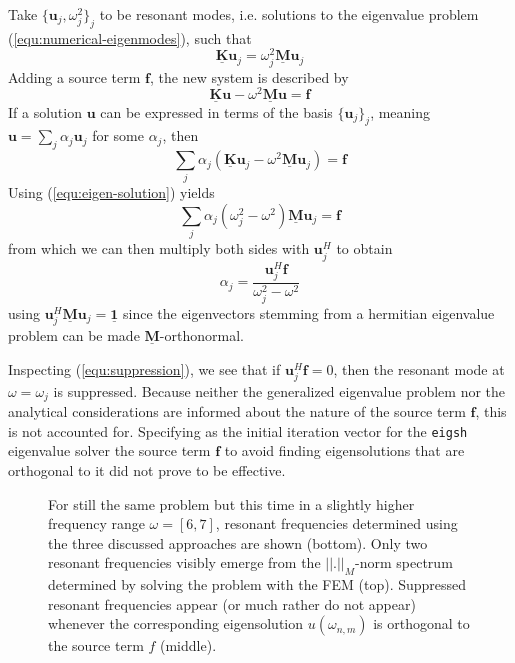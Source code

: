 \documentclass[11pt, a4paper]{article}
\begin{document}
Take $\{ \mathbf{u}_j, \omega_j^2 \}_j$ to be resonant modes, i.e. solutions to 
the eigenvalue problem (\ref{equ:numerical-eigenmodes}), such that
\begin{equation}
    \mathbf{\underline{K}} \mathbf{u}_j = \omega_j^2 \mathbf{\underline{M}} \mathbf{u}_j
    \label{equ:eigen-solution}
\end{equation}
Adding a source term $\mathbf{f}$, the new system is described by
\begin{equation}
    \mathbf{\underline{K}} \mathbf{u} - \omega^2 \mathbf{\underline{M}} \mathbf{u} = \mathbf{f}
\end{equation}
If a solution $\mathbf{u}$ can be expressed in terms of the basis $\{ \mathbf{u}_j \}_j$,
meaning $\mathbf{u} = \sum_j \alpha_j \mathbf{u}_j$ for some $\alpha_j$, then
\begin{equation} 
    \sum_j \alpha_j (\mathbf{\underline{K}} \mathbf{u}_j - \omega^2 \mathbf{\underline{M}} \mathbf{u}_j) = \mathbf{f}
\end{equation}
Using (\ref{equ:eigen-solution}) yields
\begin{equation}
    \sum_j \alpha_j (\omega_j^2 - \omega^2) \mathbf{\underline{M}} \mathbf{u}_j = \mathbf{f}
\end{equation}
from which we can then multiply both sides with $\mathbf{u}_j^H$ to obtain
\begin{equation}
    \alpha_j = \frac{\mathbf{u}_j^H \mathbf{f}}{\omega_j^2 - \omega^2} \label{equ:suppression}
\end{equation}
using $\mathbf{u}_j^H \mathbf{\underline{M}} \mathbf{u}_j = \mathbf{\underline{1}}$
since the eigenvectors stemming from a hermitian eigenvalue problem can be made 
$\mathbf{\underline{M}}$-orthonormal.

Inspecting (\ref{equ:suppression}), we see that if $\mathbf{u}_j^H \mathbf{f} = 0$,
then the resonant mode at $\omega = \omega_j$ is suppressed. Because neither the
generalized eigenvalue problem nor the analytical considerations
are informed about the nature of the source term $\mathbf{f}$, this is not accounted for.
Specifying as the initial iteration vector for the \texttt{eigsh} eigenvalue solver
the source term $\mathbf{f}$ to avoid finding eigensolutions that are orthogonal
to it did not prove to be effective.

\begin{figure}[ht]
    \centering
    
    \caption{For still the same problem but this time in a slightly higher
    frequency range $\omega = [6, 7]$, resonant frequencies determined using the
    three discussed approaches are shown (bottom). Only two resonant
    frequencies visibly emerge from the $||.||_M$-norm spectrum determined by
    solving the problem with the \acrshort{FEM} (top). Suppressed resonant
    frequencies appear (or much rather do not appear) whenever the corresponding
    eigensolution $u(\omega_{n, m})$ is orthogonal to the source term $f$ (middle).}
    \label{fig:rectangular-cavity-suppression}
\end{figure}
\end{document}
